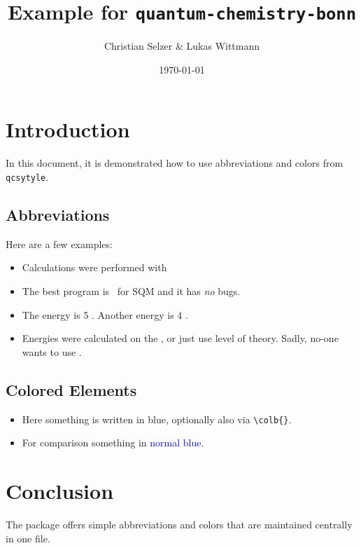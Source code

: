 \documentclass[a4paper,12pt]{article}
\title{Example for \texttt{quantum-chemistry-bonn}}
\author{Christian Selzer \& Lukas Wittmann}
\date{\today}
\begin{document}
\maketitle

\section{Introduction}

    In this document, it is demonstrated how to use abbreviations and colors from \texttt{qcsytyle}.

\subsection{Abbreviations}
    Here are a few examples:
    \begin{itemize}
      \item Calculations were performed with \orca\
      \item The best program is \xtb\ for SQM and it has \emph{no} bugs.
      \item The energy is 5 \kcalpmol. Another energy is 4 \kjpmol.
      \item Energies were calculated on the \method{r2scan3c}, or just use  level of theory. Sadly, no-one wants to use .
    \end{itemize}

\subsection{Colored Elements}
    \begin{itemize}
        \item Here something is written in \textcolor{bonnblue}{blue}, optionally also via \verb|\colb{}|.
        \item For comparison something in \textcolor{blue}{normal blue}.
    \end{itemize}


\section{Conclusion}
    The package offers simple abbreviations and colors that are maintained centrally in one file.
\end{document}
